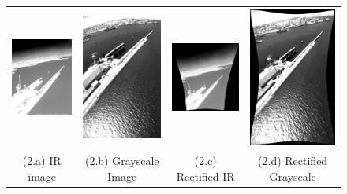 \documentclass[runningheads]{llncs}
\begin{document}
\begin{figure}
  \begin{tabular}{cccc}
    \includegraphics[width=3cm]{img/fusion/Sea/3/Infrared_Image_screenshot.png} &
    \includegraphics[width=3cm]{img/fusion/Sea/3/Grayscale_Image_screenshot.png} &
    \includegraphics[width=3cm]{img/fusion/Sea/3/Warped_Infrared_Image_screenshot.png} &
    \includegraphics[width=3cm]{img/fusion/Sea/3/Warped_Grayscale_Image_screenshot.png} \\
    \small (2.a) IR image & 
    \small (2.b) Grayscale Image &
    \small (2.c) Rectified IR &
    \small (2.d) Rectified Grayscale
  \end{tabular}
  
  \vspace{\floatsep}
  

\end{figure}
\end{document}
